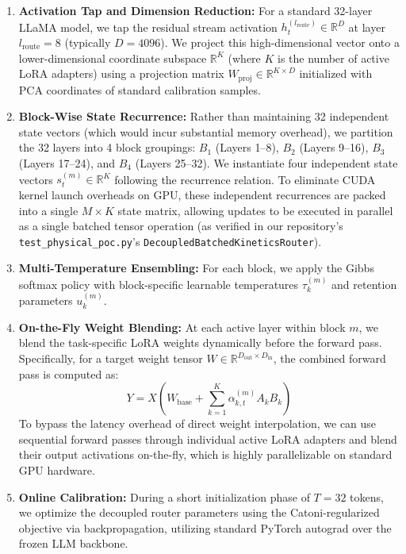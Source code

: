 \documentclass{article}
\theoremstyle{plain}
\theoremstyle{definition}
\theoremstyle{remark}
\begin{document}
\begin{enumerate}
    \item \textbf{Activation Tap and Dimension Reduction:} For a standard 32-layer LLaMA model, we tap the residual stream activation $h_t^{(l_{\text{route}})} \in \mathbb{R}^D$ at layer $l_{\text{route}} = 8$ (typically $D = 4096$). We project this high-dimensional vector onto a lower-dimensional coordinate subspace $\mathbb{R}^K$ (where $K$ is the number of active LoRA adapters) using a projection matrix $W_{\text{proj}} \in \mathbb{R}^{K \times D}$ initialized with PCA coordinates of standard calibration samples.
    \item \textbf{Block-Wise State Recurrence:} Rather than maintaining 32 independent state vectors (which would incur substantial memory overhead), we partition the 32 layers into 4 block groupings: $B_1$ (Layers 1--8), $B_2$ (Layers 9--16), $B_3$ (Layers 17--24), and $B_4$ (Layers 25--32). We instantiate four independent state vectors $s^{(m)}_t \in \mathbb{R}^K$ following the recurrence relation. To eliminate CUDA kernel launch overheads on GPU, these independent recurrences are packed into a single $M \times K$ state matrix, allowing updates to be executed in parallel as a single batched tensor operation (as verified in our repository's \texttt{test\_physical\_poc.py}'s \texttt{DecoupledBatchedKineticsRouter}).
    \item \textbf{Multi-Temperature Ensembling:} For each block, we apply the Gibbs softmax policy with block-specific learnable temperatures $\tau^{(m)}_k$ and retention parameters $u^{(m)}_k$.
    \item \textbf{On-the-Fly Weight Blending:} At each active layer within block $m$, we blend the task-specific LoRA weights dynamically before the forward pass. Specifically, for a target weight tensor $W \in \mathbb{R}^{D_{\text{out}} \times D_{\text{in}}}$, the combined forward pass is computed as:
    \begin{equation}
        Y = X \left( W_{\text{base}} + \sum_{k=1}^K \alpha^{(m)}_{k, t} A_k B_k \right)
    \end{equation}
    To bypass the latency overhead of direct weight interpolation, we can use sequential forward passes through individual active LoRA adapters and blend their output activations on-the-fly, which is highly parallelizable on standard GPU hardware.
    \item \textbf{Online Calibration:} During a short initialization phase of $T=32$ tokens, we optimize the decoupled router parameters using the Catoni-regularized objective via backpropagation, utilizing standard PyTorch autograd over the frozen LLM backbone.
\end{enumerate}
\end{document}

